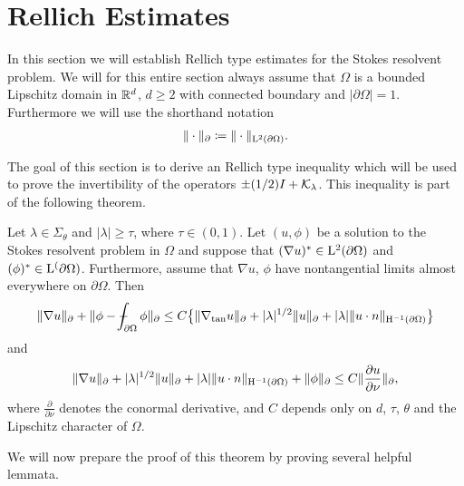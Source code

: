 \chapter{Rellich Estimates}

In this section we will establish Rellich type estimates for the Stokes resolvent problem.
We will for this entire section always assume that $\Omega$ is a bounded Lipschitz domain in $\mathbb{R}^d$, $d \geq 2$ with connected boundary and $|\partial\Omega| = 1$.
Furthermore we will use the shorthand notation
\begin{align*}
  \| \cdot \|_{\partial} \coloneqq \| \cdot \|_{\mathrm{L}^2(\partial\Omega)}.
\end{align*}

The goal of this section is to derive an Rellich type inequality which will be used to prove the invertibility of the operators $\pm(1/2)I + \mathcal{K}_{\lambda}$. 
This inequality is part of the following theorem.

\begin{thm}
  \label{thm:rellich}
  Let $\lambda \in \Sigma_\theta$ and $|\lambda| \geq \tau$, where 
  $\tau \in (0,1)$.
  Let $(u,\phi)$ be a solution to the Stokes resolvent problem in $\Omega$ and suppose that $(\nabla u)^* \in \mathrm{L}^2(\partial\Omega)$ and $(\phi)^* \in \mathrm{L}^(\partial\Omega)$.
  Furthermore, assume that $\nabla u$, $\phi$ have nontangential limits almost everywhere on $\partial\Omega$.
  Then
  \begin{align}
    \label{eq:rellich1}
    \|\nabla u\|_\partial + \|\phi - \dashint_{\partial\Omega} \phi \|_\partial
    \leq C \big\{ \|\nabla_{\mathrm{tan}} u\|_\partial + |\lambda|^{1/2} \|u\|_\partial + |\lambda| \|u \cdot n\|_{\HH^{-1}(\partial\Omega)} \big\}
  \end{align}
  and
  \begin{align}
    \label{eq:rellich2}
    \|\nabla u\|_\partial + |\lambda|^{1/2} \|u\|_\partial + |\lambda| \|u \cdot n\|_{\mathrm{H}^{-1}(\partial\Omega)} + \|\phi\|_\partial
    \leq C \|\frac{\partial u}{\partial \nu} \|_\partial,
  \end{align}
  where $\frac{\partial}{\partial \nu}$ denotes the conormal derivative, and $C$ depends only on $d$, $\tau$, $\theta$ and the Lipschitz character of $\Omega$.
\end{thm}

We will now prepare the proof of this theorem by proving several helpful lemmata.

